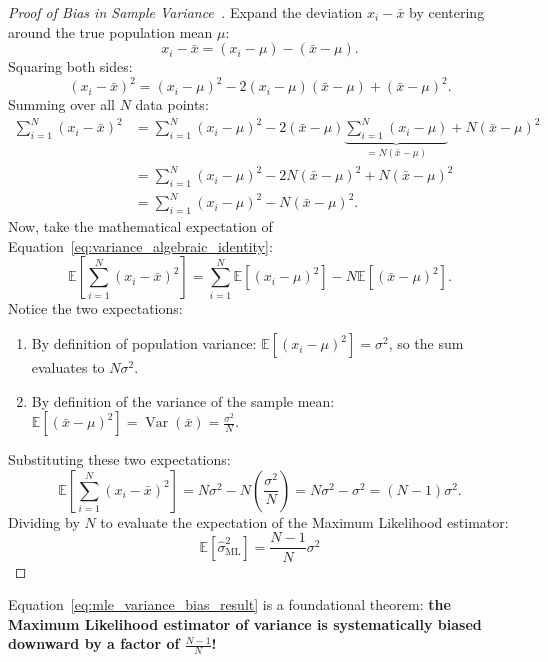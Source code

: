 \begin{proof}[Proof of Bias in Sample Variance~\cite{bishop2024deep}]
Expand the deviation $x_i - \bar{x}$ by centering around the true population mean $\mu$:
\begin{equation}
x_i - \bar{x} = (x_i - \mu) - (\bar{x} - \mu).
\end{equation}
Squaring both sides:
\begin{equation}
(x_i - \bar{x})^2 = (x_i - \mu)^2 - 2(x_i - \mu)(\bar{x} - \mu) + (\bar{x} - \mu)^2.
\end{equation}
Summing over all $N$ data points:
\begin{align}
\sum_{i=1}^N (x_i - \bar{x})^2 &= \sum_{i=1}^N (x_i - \mu)^2 - 2 (\bar{x} - \mu) \underbrace{\sum_{i=1}^N (x_i - \mu)}_{= N(\bar{x} - \mu)} + N (\bar{x} - \mu)^2 \nonumber \\
&= \sum_{i=1}^N (x_i - \mu)^2 - 2 N (\bar{x} - \mu)^2 + N (\bar{x} - \mu)^2 \nonumber \\
&= \sum_{i=1}^N (x_i - \mu)^2 - N (\bar{x} - \mu)^2.
\label{eq:variance_algebraic_identity}
\end{align}
Now, take the mathematical expectation of Equation~\eqref{eq:variance_algebraic_identity}:
\begin{equation}
\mathbb{E}\left[ \sum_{i=1}^N (x_i - \bar{x})^2 \right] = \sum_{i=1}^N \mathbb{E}\left[ (x_i - \mu)^2 \right] - N \mathbb{E}\left[ (\bar{x} - \mu)^2 \right].
\end{equation}
Notice the two expectations:
\begin{enumerate}[noitemsep]
  \item By definition of population variance: $\mathbb{E}[(x_i - \mu)^2] = \sigma^2$, so the sum evaluates to $N \sigma^2$.
  \item By definition of the variance of the sample mean: $\mathbb{E}[(\bar{x} - \mu)^2] = \operatorname{Var}(\bar{x}) = \frac{\sigma^2}{N}$.
\end{enumerate}
Substituting these two expectations:
\begin{equation}
\mathbb{E}\left[ \sum_{i=1}^N (x_i - \bar{x})^2 \right] = N \sigma^2 - N \left( \frac{\sigma^2}{N} \right) = N \sigma^2 - \sigma^2 = (N - 1) \sigma^2.
\end{equation}
Dividing by $N$ to evaluate the expectation of the Maximum Likelihood estimator:
\begin{equation}
\boxed{ \mathbb{E}[\hat{\sigma}^2_{\text{ML}}] = \frac{N - 1}{N} \sigma^2 }
\label{eq:mle_variance_bias_result}
\end{equation}
\end{proof}
Equation~\eqref{eq:mle_variance_bias_result} is a foundational theorem: \textbf{the Maximum Likelihood estimator of variance is systematically biased downward by a factor of $\frac{N-1}{N}$!} 

